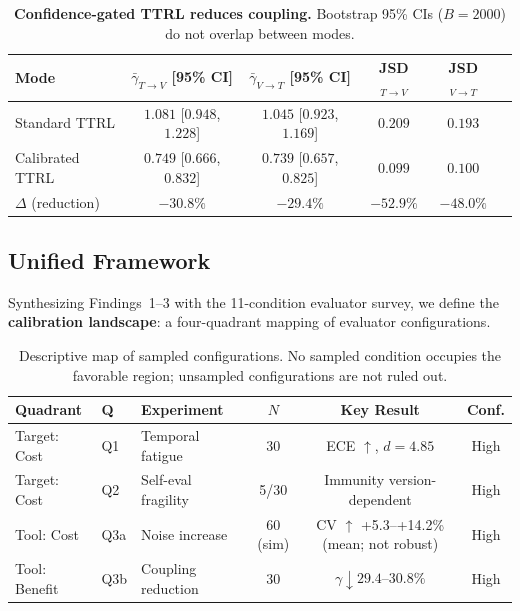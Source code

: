 \documentclass[11pt]{article}
\begin{document}
\begin{table}[H]
\centering
\caption{\textbf{Confidence-gated TTRL reduces coupling.} Bootstrap 95\% CIs ($B{=}2000$) do not overlap between modes.}
\label{tab:coupling}
\begin{tabular}{@{}lccccc@{}}
\toprule
Mode & $\bar{\gamma}_{T \to V}$ [95\% CI] & $\bar{\gamma}_{V \to T}$ [95\% CI] & JSD$_{T \to V}$ & JSD$_{V \to T}$ \\
\midrule
Standard TTRL & $1.081$ [$0.948$, $1.228$] & $1.045$ [$0.923$, $1.169$] & $0.209$ & $0.193$ \\
Calibrated TTRL & $0.749$ [$0.666$, $0.832$] & $0.739$ [$0.657$, $0.825$] & $0.099$ & $0.100$ \\
\midrule
$\Delta$ (reduction) & $-30.8\%$ & $-29.4\%$ & $-52.9\%$ & $-48.0\%$ \\
\bottomrule
\end{tabular}
\end{table}


\subsection{Unified Framework}

Synthesizing Findings~1--3 with the 11-condition evaluator survey, we define the \textbf{calibration landscape}: a four-quadrant mapping of evaluator configurations.

\begin{table}[H]
\centering
\caption{Descriptive map of sampled configurations. No sampled condition occupies the favorable region; unsampled configurations are not ruled out.}
{\small
\begin{tabular}{@{}lllccc@{}}
\toprule
Quadrant & Q & Experiment & $N$ & Key Result & Conf. \\
\midrule
Target: Cost & Q1 & Temporal fatigue & 30 & ECE $\uparrow$, $d{=}4.85$ & High \\
Target: Cost & Q2 & Self-eval fragility & 5/30 & Immunity version-dependent & High \\
Tool: Cost & Q3a & Noise increase & 60 (sim) & CV $\uparrow$ +5.3--+14.2\% (mean; not robust) & High \\
Tool: Benefit & Q3b & Coupling reduction & 30 & $\gamma \downarrow 29.4$--$30.8\%$ & High \\
\bottomrule
\end{tabular}
}
\end{table}
\end{document}
